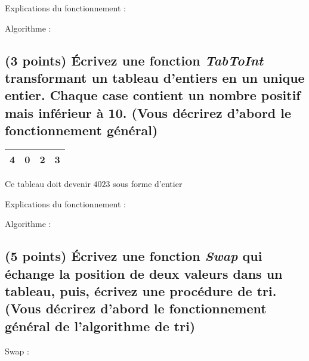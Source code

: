 \documentclass[11pt,a4paper]{article}
\begin{document}

\begin{center}
Explications du fonctionnement :

Algorithme :
\end{center}




\subsection{(3 points) \'Ecrivez une fonction \og \textit{TabToInt} \fg{} transformant un tableau d'entiers en un unique entier. Chaque case contient un nombre positif mais inférieur à 10. (Vous décrirez d'abord le fonctionnement général) }


\begin{center}
  \begin{tabular}{| c | c | c | c |}
    \hline
    4 & 0 & 2 & 3 \\
    \hline
  \end{tabular}

  \smallskip

  Ce tableau doit devenir $ 4023 $ sous forme d'entier
\end{center}


\begin{center}
Explications du fonctionnement :

Algorithme :
\end{center}


\subsection{(5 points) \'Ecrivez une fonction \og \textit{Swap} \fg{} qui échange la position de deux valeurs dans un tableau, puis, écrivez une procédure de tri. (Vous décrirez d'abord le fonctionnement général de l'algorithme de tri) }

\vfillFirst

\begin{center}
Swap :
\end{center}

\vfillLast

\clearpage
\end{document}
